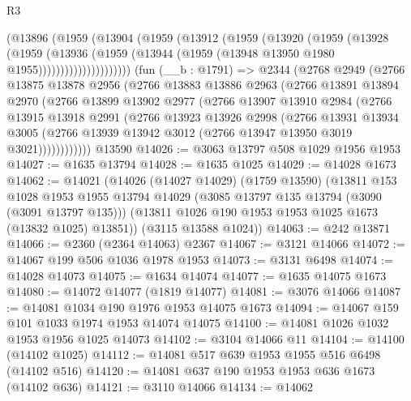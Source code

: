 \begin{lexlean}{R3}
\begin{coremodule}
                (@13896
                  (@1959
                    (@13904
                      (@1959
                        (@13912
                          (@1959
                            (@13920
                              (@1959
                                (@13928
                                  (@1959
                                    (@13936
                                      (@1959
                                        (@13944
                                          (@1959 (@13948 @13950 @1980 @1955)))))))))))))))))))))
    (fun (__b : @1791) =>
    @2344
      (@2768
        @2949
        (@2766
          @13875
          @13878
          @2956
          (@2766
            @13883
            @13886
            @2963
            (@2766
              @13891
              @13894
              @2970
              (@2766
                @13899
                @13902
                @2977
                (@2766
                  @13907
                  @13910
                  @2984
                  (@2766
                    @13915
                    @13918
                    @2991
                    (@2766
                      @13923
                      @13926
                      @2998
                      (@2766
                        @13931
                        @13934
                        @3005
                        (@2766 @13939 @13942 @3012 (@2766 @13947 @13950 @3019 @3021))))))))))))
    @13590
@14026 := @3063 @13797 @508 @1029 @1956 @1953
@14027 := @1635 @13794
@14028 := @1635 @1025
@14029 := @14028 @1673
@14062 := @14021
    (@14026
      (@14027 @14029)
      (@1759 @13590)
      (@13811
        @153
        @1028
        @1953
        @1955
        @13794
        @14029
        (@3085 @13797 @135 @13794 (@3090 (@3091 @13797 @135)))
        (@13811 @1026 @190 @1953 @1953 @1025 @1673 (@13832 @1025) @13851))
      (@3115 @13588 @1024))
@14063 := @242 @13871
@14066 := @2360 (@2364 @14063) @2367
@14067 := @3121 @14066
@14072 := @14067 @199 @506 @1036 @1978 @1953
@14073 := @3131 @6498
@14074 := @14028 @14073
@14075 := @1634 @14074
@14077 := @1635 @14075 @1673
@14080 := @14072 @14077 (@1819 @14077)
@14081 := @3076 @14066
@14087 := @14081 @1034 @190 @1976 @1953 @14075 @1673
@14094 := @14067 @159 @101 @1033 @1974 @1953 @14074 @14075
@14100 := @14081 @1026 @1032 @1953 @1956 @1025 @14073
@14102 := @3104 @14066 @11
@14104 := @14100 (@14102 @1025)
@14112 := @14081 @517 @639 @1953 @1955 @516 @6498 (@14102 @516)
@14120 := @14081 @637 @190 @1953 @1953 @636 @1673 (@14102 @636)
@14121 := @3110 @14066
@14134 := @14062

\end{coremodule}
\end{lexlean}
